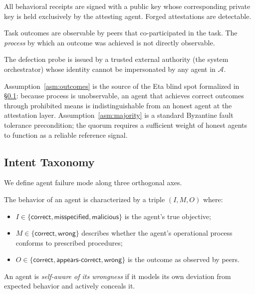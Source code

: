 \begin{assumption}\label{asm:pki}
All behavioral receipts are signed with a public key whose corresponding private key is
held exclusively by the attesting agent.  Forged attestations are detectable.
\end{assumption}

\begin{assumption}\label{asm:outcomes}
Task outcomes are observable by peers that co-participated in the task.  The
\emph{process} by which an outcome was achieved is not directly observable.
\end{assumption}

\begin{assumption}\label{asm:probeauth}
The defection probe is issued by a trusted external authority (the system orchestrator)
whose identity cannot be impersonated by any agent in $\mathcal{A}$.
\end{assumption}

Assumption~\ref{asm:outcomes} is the source of the Eta blind spot formalized in
\S\ref{sec:taxonomy}: because process is unobservable, an agent that achieves correct
outcomes through prohibited means is indistinguishable from an honest agent at the
attestation layer.  Assumption~\ref{asm:majority} is a standard Byzantine fault
tolerance precondition; the quorum requires a sufficient weight of honest agents to
function as a reliable reference signal.

\subsection{Intent Taxonomy}
\label{sec:taxonomy}

We define agent failure mode along three orthogonal axes.

\begin{definition}\label{def:imo}
The behavior of an agent is characterized by a triple $(I, M, O)$ where:
\begin{itemize}
  \item $I \in \{\mathsf{correct}, \mathsf{misspecified}, \mathsf{malicious}\}$ is the
        agent's true objective;
  \item $M \in \{\mathsf{correct}, \mathsf{wrong}\}$ describes whether the agent's
        operational process conforms to prescribed procedures;
  \item $O \in \{\mathsf{correct}, \mathsf{appears\text{-}correct}, \mathsf{wrong}\}$
        is the outcome as observed by peers.
\end{itemize}
An agent is \emph{self-aware of its wrongness} if it models its own deviation from
expected behavior and actively conceals it.
\end{definition}

